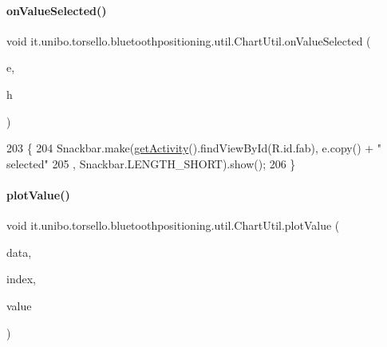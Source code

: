 \paragraph{\texorpdfstring{on\+Value\+Selected()}{onValueSelected()}}
{\footnotesize\ttfamily void it.\+unibo.\+torsello.\+bluetoothpositioning.\+util.\+Chart\+Util.\+on\+Value\+Selected (\begin{DoxyParamCaption}\item[{Entry}]{e,  }\item[{Highlight}]{h }\end{DoxyParamCaption})}


\begin{DoxyCode}
203                                                       \{
204         Snackbar.make(\hyperlink{classit_1_1unibo_1_1torsello_1_1bluetoothpositioning_1_1util_1_1ChartUtil_a59150a6d20b6d0ad2fcf8c1ba858d355_a59150a6d20b6d0ad2fcf8c1ba858d355}{getActivity}().findViewById(R.id.fab), e.copy() + \textcolor{stringliteral}{" selected"}
205                 , Snackbar.LENGTH\_SHORT).show();
206     \}
\end{DoxyCode}
\hypertarget{classit_1_1unibo_1_1torsello_1_1bluetoothpositioning_1_1util_1_1ChartUtil_a86398d4aca978fbfc10c71039191635e_a86398d4aca978fbfc10c71039191635e}{}\label{classit_1_1unibo_1_1torsello_1_1bluetoothpositioning_1_1util_1_1ChartUtil_a86398d4aca978fbfc10c71039191635e_a86398d4aca978fbfc10c71039191635e} 
\paragraph{\texorpdfstring{plot\+Value()}{plotValue()}}
{\footnotesize\ttfamily void it.\+unibo.\+torsello.\+bluetoothpositioning.\+util.\+Chart\+Util.\+plot\+Value (\begin{DoxyParamCaption}\item[{Line\+Data}]{data,  }\item[{int}]{index,  }\item[{Double}]{value }\end{DoxyParamCaption})\hspace{0.3cm}{\ttfamily [private]}}


